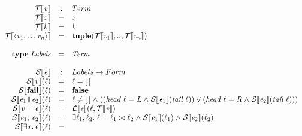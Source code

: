 \documentclass[acmsmall,review,dvipsnames]{acmart}
\newcommand{\Conid}[1]{\mathit{#1}}
\newcommand{\Varid}[1]{\mathit{#1}}
\newcommand{\Term}{Term}
\newcommand{\Labels}{Labels}
\newcommand{\Forml}{Form}
\newcommand{\semfun}[1]{\mathcal{#1}}
\newcommand{\folapp}[2]{\semfun{L}\llbracket #1 \rrbracket #2}
\newcommand{\sfolapp}[2]{\semfun{S}\llbracket #1 \rrbracket #2}
\newcommand{\termapp}[2]{\semfun{T}\llbracket #1 \rrbracket #2}
\begin{document}
\begin{figure}
$$
  \begin{array}{rcll}
  \termapp{\ensuremath{\Varid{v}}} & : & \Term \\
  \termapp{\ensuremath{\Varid{x}}} & = & \ensuremath{\Varid{x}} \\
  \termapp{\ensuremath{\Varid{k}}} & = & \ensuremath{\Varid{k}} \\
  \termapp{\ensuremath{\langle{}\Varid{v}_{\mathrm{1}},\mathinner{\ldotp\ldotp},\Varid{v}_{\Varid{n}}\rangle}} & = & \mathbf{tuple}(\termapp{\ensuremath{\Varid{v}_{\mathrm{1}}}},..,\termapp{\ensuremath{\Varid{v}_{\Varid{n}}}}) \\
~ \\
  \ensuremath{\textbf{type}\;\Conid{Labels}} & \ensuremath{\mathrel{=}} & \ensuremath{\Conid{Term}} \\
~ \\
  \sfolapp{\ensuremath{\Varid{e}}} & : & \Labels \rightarrow \Forml \\
  \sfolapp{\ensuremath{\Varid{v}}}(\ensuremath{\ell}) & = & \ensuremath{\ell\mathrel{=}[\mskip1.5mu \mskip1.5mu]} \\
  \sfolapp{\ensuremath{\textbf{fail}}}(\ensuremath{\ell}) & = & \ensuremath{\textbf{false}} \\
  \sfolapp{\ensuremath{\Varid{e}_{\mathrm{1}}\;\rule[-0.1em]{0.15em}{0.75em}\;\Varid{e}_{\mathrm{2}}}}(\ensuremath{\ell}) & = &
    \ensuremath{\ell} \not= \ensuremath{[\mskip1.5mu \mskip1.5mu]\mathrel{\wedge}((\Varid{head}\;\ell\mathrel{=}\Conid{L}\mathrel{\wedge}} \sfolapp{\ensuremath{\Varid{e}_{\mathrm{1}}}}(\ensuremath{\Varid{tail}\;\ell}))
    \vee (\ensuremath{\Varid{head}\;\ell\mathrel{=}\Conid{R}\mathrel{\wedge}} \sfolapp{\ensuremath{\Varid{e}_{\mathrm{2}}}}(\ensuremath{\Varid{tail}\;\ell}))) \\
  \sfolapp{\ensuremath{\Varid{v}\mathrel{=}\Varid{e}}}(\ensuremath{\ell}) & = &
    \folapp{\ensuremath{\Varid{e}}}(\ensuremath{\ell,\termapp{\Varid{v}}}) \\
  \sfolapp{\ensuremath{\Varid{e}_{\mathrm{1}};\,\Varid{e}_{\mathrm{2}}}}(\ensuremath{\ell}) & = &
  \exists \ensuremath{\ell_1,\ell_2} . \; \ensuremath{\ell\mathrel{=}\ell_1\bowtie\ell_2\mathrel{\wedge}} 
    \sfolapp{\ensuremath{\Varid{e}_{\mathrm{1}}}}(\ensuremath{\ell_1}) \ensuremath{\mathrel{\wedge}} \sfolapp{\ensuremath{\Varid{e}_{\mathrm{2}}}}(\ensuremath{\ell_2}) \\
  \sfolapp{\ensuremath{\exists\Varid{x}.\,\Varid{e}}}(\ensuremath{\ell}) & = &

\end{array}$$
\end{figure}
\end{document}
